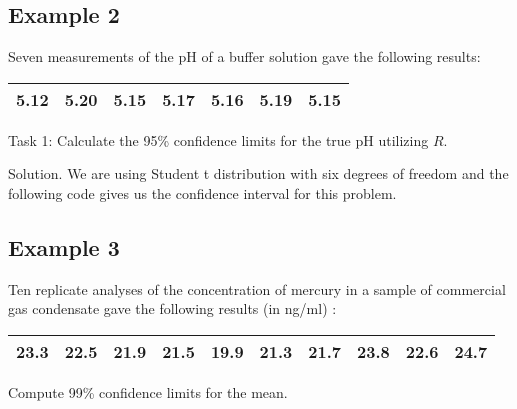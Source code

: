 \documentclass[]{report}
\begin{document}
\subsection{Example 2}

Seven measurements of the pH of a buffer solution gave the
following results:

\begin{center}
	\begin{tabular}{|c|c|c|c|c|c|c|}
		\hline
		5.12 & 5.20 & 5.15 & 5.17 & 5.16 & 5.19 & 5.15\\
		\hline
	\end{tabular}
\end{center}


Task 1: Calculate the 95\% confidence limits for the true pH
utilizing $R$.


Solution. We are using Student t distribution with six degrees of
freedom and the following code gives us the confidence interval
for this problem.

\subsection{Example 3} Ten replicate analyses of the concentration
of mercury in a sample of commercial gas condensate gave the
following results (in ng/ml) :

\begin{center}
	\begin{tabular}{|c|c|c|c|c|c|c|c|c|c|}
		\hline
		23.3 & 22.5 & 21.9 & 21.5 & 19.9 & 21.3 & 21.7 & 23.8 & 22.6 &
		24.7\\
		\hline
	\end{tabular}
\end{center}

Compute 99\% confidence limits for the mean.


\newpage
\end{document}
